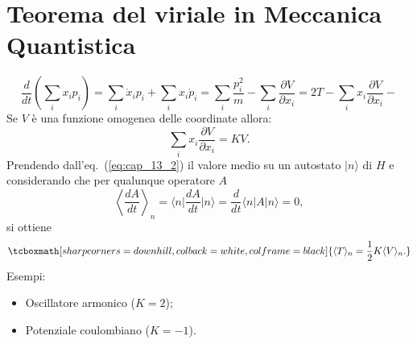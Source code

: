 \section{Teorema del viriale in Meccanica Quantistica}
	\begin{equation}
	\label{eq:cap_13_2}
		\frac{d}{dt}\left( \sum _i x_i p_i \right) = \sum _i\dot{x}_i p_i + \sum _i	x_i \dot{p}_i = \sum _i \frac{p_i ^2}{m}- \sum _i \frac{\partial V}{\partial x_i} = 2T - \sum _i x_i \frac{\partial V}{\partial x_i}-
	\end{equation}
Se $V$ è una funzione omogenea delle coordinate allora:
	\begin{equation}
		\sum _ i x_i \frac{\partial V}{\partial x_i} = KV.
	\end{equation}
Prendendo dall'eq.~(\ref{eq:cap_13_2}) il valore medio su un autostato $\vert n \rangle$ di $H$ e considerando che per qualunque operatore $A$
	\begin{equation}
		\left\langle \frac{dA}{dt} \right\rangle _n = \langle n \vert \frac{dA}{dt}\vert n \rangle = \frac{d}{dt}\langle n \vert A \vert n \rangle = 0, 
	\end{equation}
si ottiene
	\begin{equation}
		\tcboxmath[sharp corners=downhill, colback=white, colframe=black]{
		\langle T \rangle _n = \frac{1}{2} K \langle V \rangle _n.
		}
	\end{equation}
Esempi:\begin{itemize}
\item Oscillatore armonico ($K=2$);
\item Potenziale coulombiano ($K=-1$).
\end{itemize}
